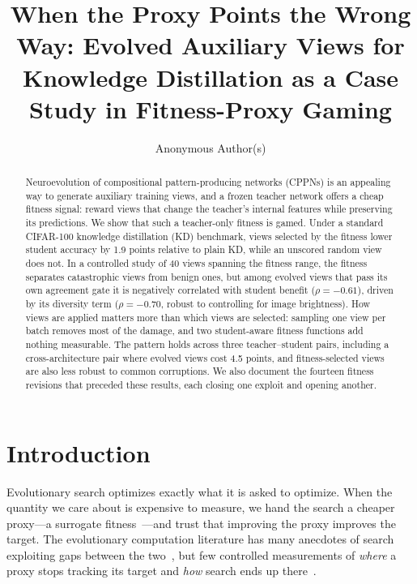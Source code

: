 \documentclass[sigconf,review,anonymous]{acmart}
\begin{document}
\title{When the Proxy Points the Wrong Way: Evolved Auxiliary Views for
Knowledge Distillation as a Case Study in Fitness-Proxy Gaming}

\author{Anonymous Author(s)}

\begin{abstract}
Neuroevolution of compositional pattern-producing networks (CPPNs) is an
appealing way to generate auxiliary training views, and a frozen teacher
network offers a cheap fitness signal: reward views that change the
teacher's internal features while preserving its predictions. We show that
such a teacher-only fitness is gamed. Under a standard CIFAR-100 knowledge
distillation (KD) benchmark, views selected by the fitness lower student
accuracy by 1.9 points relative to plain KD, while an unscored random view
does not. In a controlled study of 40 views spanning the fitness range, the
fitness separates catastrophic views from benign ones, but among evolved
views that pass its own agreement gate it is negatively correlated with
student benefit ($\rho=-0.61$), driven by its diversity term ($\rho=-0.70$,
robust to controlling for image brightness). How views are applied matters
more than which views are selected: sampling one view per batch removes
most of the damage, and two student-aware fitness functions add nothing
measurable. The pattern holds across three teacher--student pairs,
including a cross-architecture pair where evolved views cost 4.5 points,
and fitness-selected views are also less robust to common corruptions. We
also document the fourteen fitness revisions that preceded these results,
each closing one exploit and opening another.
\end{abstract}


\maketitle

\section{Introduction}

Evolutionary search optimizes exactly what it is asked to optimize. When the
quantity we care about is expensive to measure, we hand the search a cheaper
proxy---a surrogate fitness~\cite{jin2011surrogate}---and trust that
improving the proxy improves the target. The evolutionary computation
literature has many anecdotes of search exploiting gaps between the
two~\cite{lehman2020surprising,krakovna2020specification}, but few
controlled measurements of \emph{where} a proxy stops tracking its target
and \emph{how} search ends up there~\cite{manheim2018goodhart}.
\end{document}
